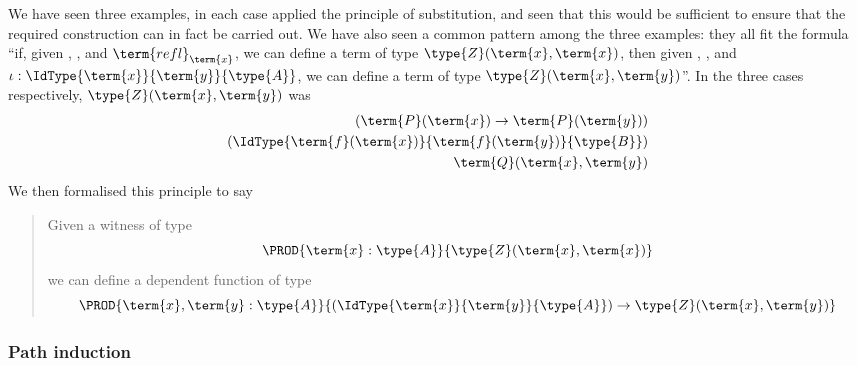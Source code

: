 We have seen three examples, in each case applied the principle of substitution, and seen that this would be sufficient to ensure that the required construction can in fact be carried out.  We have also seen a common pattern among the three examples: they all fit the formula 
``if, 
given 
, , and $\term{refl}_{\term{x}}$, 
we can define a term of type 
$\type{Z}(\term{x},\term{x})$, then 
given 
, , and $\iota:\IdType{\term{x}}{\term{y}}{\type{A}}$, 
we can define a term of type 
$\type{Z}(\term{x},\term{y})$''.  In the three cases respectively, 
$\type{Z}(\term{x},\term{y})$ was 
\begin{align*}
(\term{P}(\term{x}) \to \term{P}(\term{y}))
\\
(\IdType
{\term{f}(\term{x})}
{\term{f}(\term{y})}
{\type{B}})
\\
{\term{Q}(\term{x},\term{y})}
\end{align*}
We then formalised this principle to say 
\begin{quote}
Given 
a witness of type
\[
\PROD{\term{x}:\type{A}}
{\type{Z}(\term{x},\term{x})}
\]
we can define a dependent function of type
\[
\PROD{\term{x},\term{y}:\type{A}}
{(\IdType{\term{x}}{\term{y}}{\type{A}}) \to 
\type{Z}(\term{x},\term{y})}
\]
\end{quote}


\newpage

\subsubsection{Path induction}

